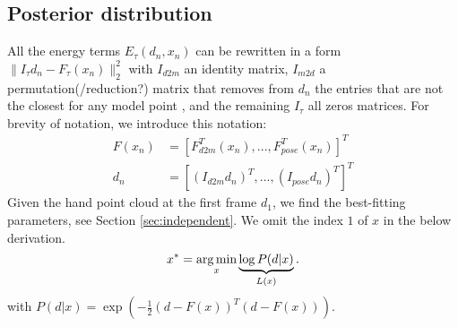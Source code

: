 \subsection{Posterior distribution}
\label{sec:posterior}
All the energy terms $E_{\tau}(d_n, x_n)$ can be rewritten in a form $\|I_{\tau} d_n - F_{\tau} (x_n)\|_2^2$ with $I_{d2m}$ an identity matrix, $I_{m2d}$ a permutation(/reduction?) matrix that removes from $d_n$ the entries that are not the closest for any model point , and the remaining $I_{\tau}$ all zeros matrices.
% 
For brevity of notation, we introduce this notation:
% 
\begin{align}
F(x_n) &= \left[F_{d2m}^T(x_n), ..., F_{pose}^T(x_n)\right]^T \\
d_n &= \left[(I_{d2m} d_n)^T, ..., (I_{pose} d_n)^T\right]^T
\end{align}
% 
Given the hand point cloud at the first frame $d_1$, we find the best-fitting parameters, see Section \ref{sec:independent}.  We omit the index $1$ of $x$ in the below derivation.
\begin{equation}
x^* = \operatorname*{arg\,min}_{x} \underbrace{\log  P(d|x)}_{L(x)} \label{eq:independent}. 
\end{equation}
%
with $P(d|x) = \exp \left( - \tfrac{1}{2}(d - F(x))^T (d - F(x)) \right)$.

